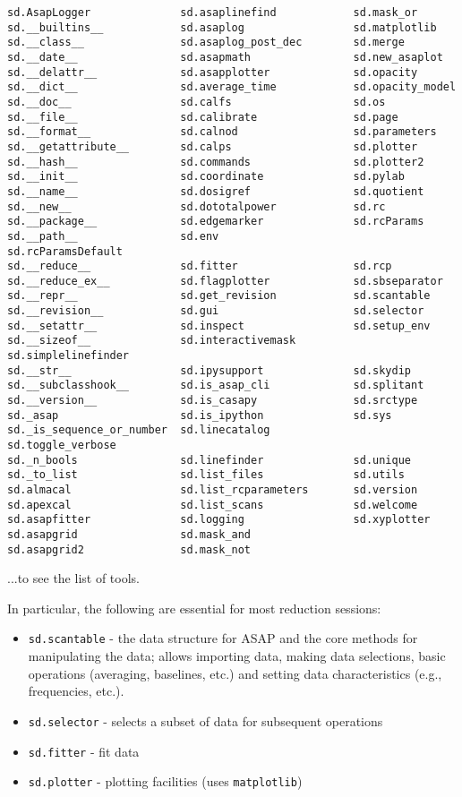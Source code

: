 \small
\begin{verbatim}
sd.AsapLogger              sd.asaplinefind            sd.mask_or
sd.__builtins__            sd.asaplog                 sd.matplotlib
sd.__class__               sd.asaplog_post_dec        sd.merge
sd.__date__                sd.asapmath                sd.new_asaplot
sd.__delattr__             sd.asapplotter             sd.opacity
sd.__dict__                sd.average_time            sd.opacity_model
sd.__doc__                 sd.calfs                   sd.os
sd.__file__                sd.calibrate               sd.page
sd.__format__              sd.calnod                  sd.parameters
sd.__getattribute__        sd.calps                   sd.plotter
sd.__hash__                sd.commands                sd.plotter2
sd.__init__                sd.coordinate              sd.pylab
sd.__name__                sd.dosigref                sd.quotient
sd.__new__                 sd.dototalpower            sd.rc
sd.__package__             sd.edgemarker              sd.rcParams
sd.__path__                sd.env                     sd.rcParamsDefault
sd.__reduce__              sd.fitter                  sd.rcp
sd.__reduce_ex__           sd.flagplotter             sd.sbseparator
sd.__repr__                sd.get_revision            sd.scantable
sd.__revision__            sd.gui                     sd.selector
sd.__setattr__             sd.inspect                 sd.setup_env
sd.__sizeof__              sd.interactivemask         sd.simplelinefinder
sd.__str__                 sd.ipysupport              sd.skydip
sd.__subclasshook__        sd.is_asap_cli             sd.splitant
sd.__version__             sd.is_casapy               sd.srctype
sd._asap                   sd.is_ipython              sd.sys
sd._is_sequence_or_number  sd.linecatalog             sd.toggle_verbose
sd._n_bools                sd.linefinder              sd.unique
sd._to_list                sd.list_files              sd.utils
sd.almacal                 sd.list_rcparameters       sd.version
sd.apexcal                 sd.list_scans              sd.welcome
sd.asapfitter              sd.logging                 sd.xyplotter
sd.asapgrid                sd.mask_and                
sd.asapgrid2               sd.mask_not                
\end{verbatim}
\normalsize

...to see the list of tools.

In particular, the following are essential for most reduction
sessions: 
\begin{itemize}
   \item {\tt sd.scantable} - the data structure for ASAP and the core
         methods for manipulating the data; allows importing data,
         making data selections, basic operations (averaging,
         baselines, etc.) and setting data characteristics (e.g.,
         frequencies, etc.).
   \item {\tt sd.selector} - selects a subset of data for subsequent operations
   \item {\tt sd.fitter} - fit data 
   \item {\tt sd.plotter} - plotting facilities (uses {\tt matplotlib})
\end{itemize}

